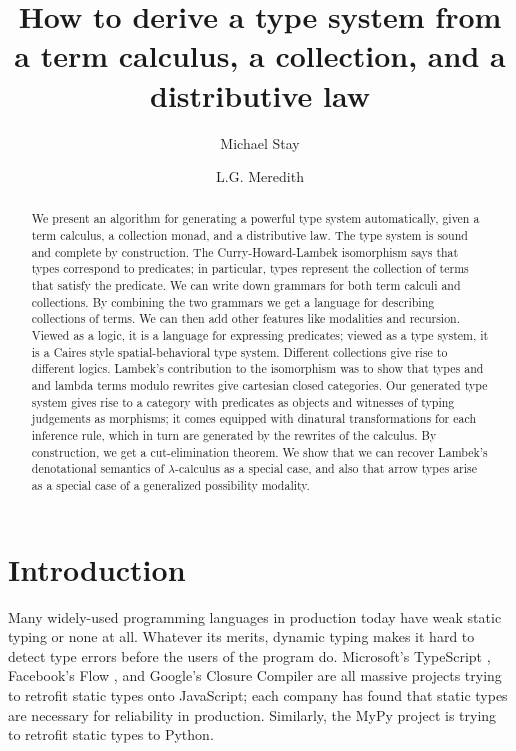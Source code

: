 \documentclass[submission,copyright,creativecommons]{eptcs}
\newcommand{\lac}{$\lambda\mbox{-calculus}$\xspace}
\begin{document}
\EnableBpAbbreviations
\title{How to derive a type system from a term calculus, a collection, and a distributive law}
\author{Michael Stay
  \and
  L.G. Meredith
}
\maketitle
\begin{abstract}
  \noindent We present an algorithm for generating a powerful type system automatically, given a term calculus, a collection monad, and a distributive law.  The type system is sound and complete by construction.  The Curry-Howard-Lambek isomorphism says that types correspond to predicates; in particular, types represent the collection of terms that satisfy the predicate.  We can write down grammars for both term calculi and collections. By combining the two grammars we get a language for describing collections of terms.  We can then add other features like modalities and recursion.  Viewed as a logic, it is a language for expressing predicates; viewed as a type system, it is a Caires style spatial-behavioral type system.  Different collections give rise to different logics.  Lambek's contribution to the isomorphism was to show that types and and lambda terms modulo rewrites give cartesian closed categories.  Our generated type system gives rise to a category with predicates as objects and witnesses of typing judgements as morphisms; it comes equipped with dinatural transformations for each inference rule, which in turn are generated by the rewrites of the calculus.  By construction, we get a cut-elimination theorem.  We show that we can recover Lambek's denotational semantics of \lac as a special case, and also that arrow types arise as a special case of a generalized possibility modality.
\end{abstract}

\EnableBpAbbreviations

\section{Introduction}

Many widely-used programming languages in production today have weak static typing or none at all.  Whatever its merits, dynamic typing makes it hard to detect type errors before the users of the program do.  Microsoft's TypeScript \cite{TypeScript},
Facebook's Flow \cite{Flow}, 
and Google's Closure Compiler \cite{Closure}
are all massive projects trying to retrofit static types onto JavaScript; each company has found that static types are necessary for reliability in production.  Similarly, the MyPy project \cite{MyPy}
is trying to retrofit static types to Python.
\end{document}
